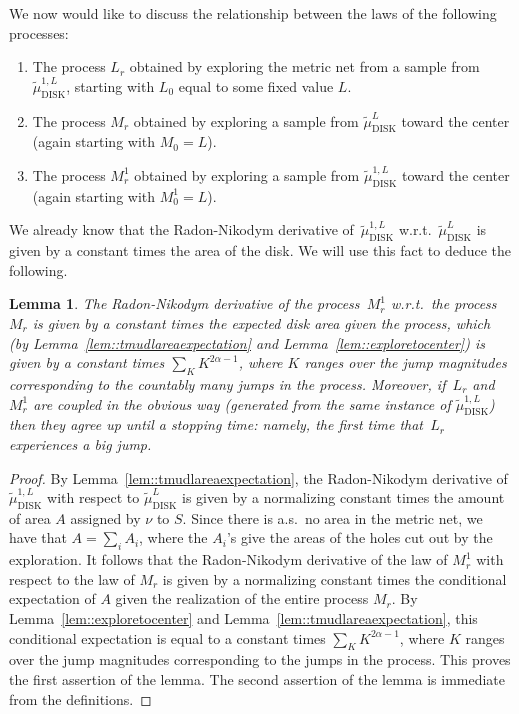 \documentclass[10pt]{amsart}
\theoremstyle{plain}
\numberwithin{theorem}{section}
\newtheorem{lemma}[theorem]{Lemma}
\theoremstyle{definition}
\newcommand{\tmudonel}{\wt{\mu}_{ \mathrm{DISK}}^{1, L}}
\newcommand{\tmudl}{\wt{\mu}_{\mathrm{DISK}}^L}
\let\wt\widetilde
\begin{document}
We now would like to discuss the relationship between the laws of the following processes:
\begin{enumerate} \item The process $L_r$ obtained by exploring the metric net from a sample from $\tmudonel$, starting with $L_0$ equal to some fixed value $L$.
\item The process $M_r$ obtained by exploring a sample from $\tmudl$ toward the center (again starting with $M_0 = L$).
\item The process $M_r^1$ obtained by exploring a sample from $\tmudonel$ toward the center (again starting with $M_0^1 = L$).
\end{enumerate}

We already know that the Radon-Nikodym derivative of~$\tmudonel$ w.r.t.\ $\tmudl$ is given by a constant times the area of the disk. We will use this fact to deduce the following.

\begin{lemma}
\label{lem::explorationprocessrelationships}
The Radon-Nikodym derivative of the process~$M_r^1$ w.r.t.\ the process~$M_r$ is given by a constant times the \emph{expected} disk area given the process, which (by Lemma~\ref{lem::tmudlareaexpectation} and Lemma~\ref{lem::exploretocenter}) is given by a constant times $\sum_K K^{2\alpha - 1}$, where $K$ ranges over the jump magnitudes corresponding to the countably many jumps in the process. Moreover, if~$L_r$ and~$M_r^1$ are coupled in the obvious way (\ie generated from the same instance of $\tmudonel$) then they agree up until a stopping time: namely, the first time that~$L_r$ experiences a big jump.
\end{lemma}
\begin{proof}
By Lemma~\ref{lem::tmudlareaexpectation}, the Radon-Nikodym derivative of $\tmudonel$ with respect to $\tmudl$ is given by a normalizing constant times the amount of area $A$ assigned by $\nu$ to $S$. Since there is a.s.\ no area in the metric net, we have that $A = \sum_i A_i$, where the $A_i$'s give the areas of the holes cut out by the exploration. It follows that the Radon-Nikodym derivative of the law of $M_r^1$ with respect to the law of $M_r$ is given by a normalizing constant times the conditional expectation of $A$ given the realization of the entire process $M_r$. By Lemma~\ref{lem::exploretocenter} and Lemma~\ref{lem::tmudlareaexpectation}, this conditional expectation is equal to a constant times $\sum_K K^{2\alpha-1}$, where $K$ ranges over the jump magnitudes corresponding to the jumps in the process. This proves the first assertion of the lemma. The second assertion of the lemma is immediate from the definitions.
\end{proof}
\end{document}
